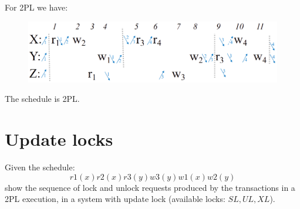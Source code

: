 \documentclass[12pt, a4paper]{report}
\newtheorem[style=M,bodystyle=\normalfont]{theorem}{Theorem}
\newtheorem[style=M,bodystyle=\normalfont]{corollary}{Corollary}
\newtheorem[style=M,bodystyle=\normalfont]{lemma}{Lemma}
\newtheorem[style=M,bodystyle=\normalfont]{definition}{Definition}
\begin{document}
        For 2PL we have: 
        \begin{figure}[H]
            \centering
            \includegraphics[width=1\linewidth]{images/2PL8.png}
        \end{figure}
        The schedule is 2PL. 

    \newpage

    \section{Update locks}
        Given the schedule:
        \[r1(x) r2(x) r3(y) w3(y) w1(x) w2(y)\]
        show the sequence of lock and unlock requests produced by the transactions in a 2PL execution, in a system with update lock (available locks: $SL, UL, XL$).
\end{document}
